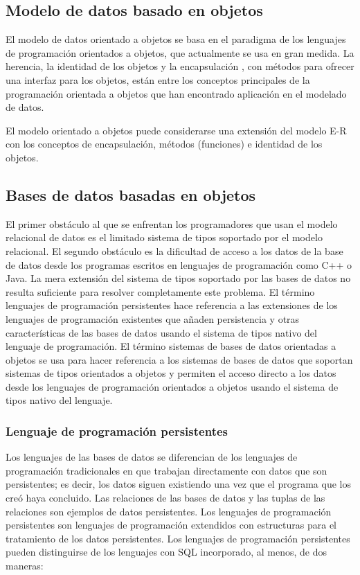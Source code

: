 \documentclass[preprint,12pt]{elsarticle}
\begin{document}
\subsection {\textbf{Modelo de datos basado en objetos\\}} \cite{SilberschatzKorthSudarshan2006}
El modelo de datos orientado a objetos se basa en el paradigma de los lenguajes de programación orientados a objetos, que actualmente se usa en gran medida. La herencia, la identidad de los objetos y la encapsulación , con métodos para ofrecer una interfaz para los objetos, están entre los conceptos principales de la programación orientada a objetos que han encontrado aplicación en el modelado de datos.

El modelo orientado a objetos puede considerarse una extensión del modelo E-R con los conceptos de encapsulación, métodos (funciones) e identidad de los objetos. %




\subsection{\textbf{Bases de datos basadas en objetos}} \cite{SilberschatzKorthSudarshan2006}
El primer obstáculo al que se enfrentan los programadores que usan el modelo relacional de datos es el limitado sistema de tipos soportado por el modelo relacional. El segundo obstáculo es la dificultad de acceso a los datos de la base de datos desde los programas escritos en lenguajes de programación como C++ o Java. La mera extensión del sistema de tipos soportado por las bases de datos no resulta suficiente para resolver completamente este problema.
El término lenguajes de programación persistentes hace referencia a las extensiones de los lenguajes de programación existentes que añaden persistencia y otras características de las bases de datos usando el sistema de tipos nativo del lenguaje de programación. El término sistemas de bases de datos orientadas a objetos se usa para hacer referencia a los sistemas de bases de datos que soportan sistemas de tipos orientados a objetos y permiten el acceso directo a los datos desde los lenguajes de programación orientados a objetos usando el sistema de tipos nativo del lenguaje. 


\subsubsection{\textbf{Lenguaje de programación persistentes}} \cite{SilberschatzKorthSudarshan2006}
Los lenguajes de las bases de datos se diferencian de los lenguajes de programación tradicionales en que trabajan directamente con datos que son persistentes; es decir, los datos siguen existiendo una vez que el programa que los creó haya concluido. Las relaciones de las bases de datos y las tuplas de las relaciones son ejemplos de datos persistentes.
Los lenguajes de programación persistentes son lenguajes de programación extendidos con estructuras para el tratamiento de los datos persistentes. Los lenguajes de programación persistentes pueden distinguirse de los lenguajes con SQL incorporado, al menos, de dos maneras:
\end{document}

